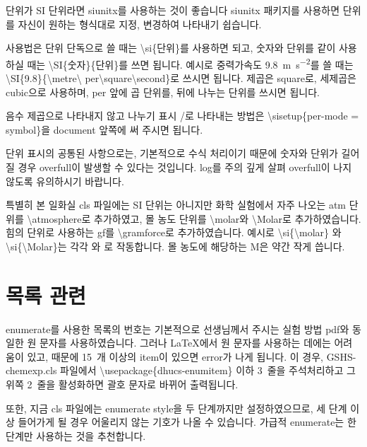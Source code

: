 \documentclass[a4paper,10pt]{article}
\begin{document}
	단위가 SI 단위라면 siunitx를 사용하는 것이 좋습니다
	siunitx 패키지를 사용하면 단위를 자신이 원하는 형식대로 지정, 변경하여 
	나타내기 쉽습니다.
	
	사용법은 단위 단독으로 쓸 때는
	\textbackslash si\{단위\}를 사용하면 되고,
	숫자와 단위를 같이 사용하실 때는
	\textbackslash SI\{숫자\}\{단위\}를 쓰면 됩니다.
	예시로 중력가속도 \SI{9.8}{\metre\per\square\second}를 쓸 때는
	\textbackslash SI\{9.8\}\{\textbackslash metre\textbackslash
	per\textbackslash square\textbackslash second\}로 쓰시면 됩니다.
	제곱은 square로, 세제곱은 cubic으로 사용하며,
	per 앞에 곱 단위를, 뒤에 나누는 단위를 쓰시면 됩니다.
	
	음수 제곱으로 나타내지 않고 나누기 표시 /로 나타내는 방법은
	\textbackslash sisetup\{per-mode = symbol\}을 document 앞쪽에
	써 주시면 됩니다.
	
	단위 표시의 공통된 사항으로는, 기본적으로 수식 처리이기 때문에
	숫자와 단위가 길어질 경우 overfull이 발생할 수 있다는 것입니다.
	log를 주의 깊게 살펴 overfull이 나지 않도록 유의하시기 바랍니다.
	
	특별히 본 일화실 cls 파일에는 SI 단위는 아니지만
	화학 실험에서 자주 나오는 atm 단위를 \textbackslash atmosphere로
	추가하였고, 몰 농도 단위를
	\textbackslash molar와 \textbackslash Molar로 추가하였습니다.
	힘의 단위로 사용하는 gf를 \textbackslash gramforce로 추가하였습니다.
	예시로 \textbackslash si\{\textbackslash molar\} 와
	\textbackslash si\{\textbackslash Molar\}는
	각각 \si{\molar} 와 \si{\Molar}로 작동합니다.
	몰 농도에 해당하는 M은 약간 작게 씁니다.
	
	\section{목록 관련}
	enumerate를 사용한 목록의 번호는 기본적으로 선생님께서 주시는
	실험 방법 pdf와 동일한 원 문자를 사용하였습니다.
	그러나 \LaTeX 에서 원 문자를 사용하는 데에는 어려움이 있고, 때문에
	15~개 이상의 item이 있으면 error가 나게 됩니다. 이 경우,
	GSHS-chemexp.cls 파일에서
	\textbackslash usepackage\{dhucs-enumitem\} 이하 3~줄을
	주석처리하고 그 위쪽 2~줄을 활성화하면 괄호 문자로 바뀌어 출력됩니다.
	
	또한, 지금 cls 파일에는 enumerate style을 두 단계까지만 설정하였으므로,
	세 단계 이상 들어가게 될 경우 어울리지 않는 기호가 나올 수 있습니다.
	가급적 enumerate는 한 단계만 사용하는 것을 추천합니다.	
	
\end{document}
